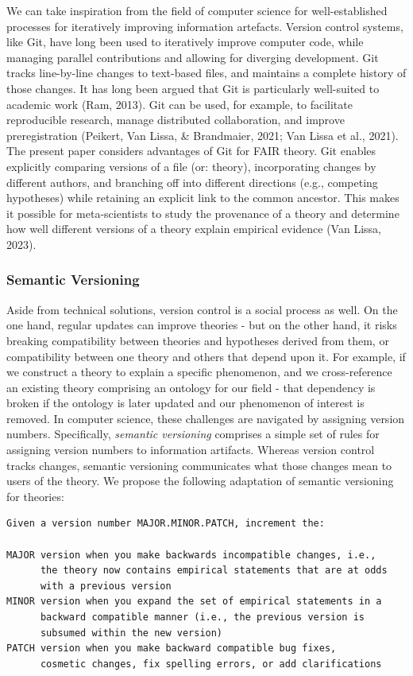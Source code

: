 \documentclass[
  man,floatsintext]{apa6}
\begin{document}
We can take inspiration from the field of computer science for well-established processes for iteratively improving information artefacts.
Version control systems, like Git, have long been used to iteratively improve computer code, while managing parallel contributions and allowing for diverging development.
Git tracks line-by-line changes to text-based files,
and maintains a complete history of those changes.
It has long been argued that Git is particularly well-suited to academic work (Ram, 2013).
Git can be used, for example, to facilitate reproducible research, manage distributed collaboration, and improve preregistration (Peikert, Van Lissa, \& Brandmaier, 2021; Van Lissa et al., 2021).
The present paper considers advantages of Git for FAIR theory.
Git enables explicitly comparing versions of a file (or: theory),
incorporating changes by different authors,
and branching off into different directions (e.g., competing hypotheses) while retaining an explicit link to the common ancestor.
This makes it possible for meta-scientists to study the provenance of a theory and determine how well different versions of a theory explain empirical evidence (Van Lissa, 2023).

\subsubsection{Semantic Versioning}\label{semantic-versioning}

Aside from technical solutions, version control is a social process as well.
On the one hand, regular updates can improve theories - but on the other hand, it risks breaking compatibility between theories and hypotheses derived from them, or compatibility between one theory and others that depend upon it.
For example, if we construct a theory to explain a specific phenomenon, and we cross-reference an existing theory comprising an ontology for our field - that dependency is broken if the ontology is later updated and our phenomenon of interest is removed.
In computer science, these challenges are navigated by assigning version numbers.
Specifically, \emph{semantic versioning} comprises a simple set of rules for assigning version numbers to information artifacts.
Whereas version control tracks changes,
semantic versioning communicates what those changes mean to users of the theory.
We propose the following adaptation of semantic versioning for theories:

\begin{verbatim}
Given a version number MAJOR.MINOR.PATCH, increment the:

MAJOR version when you make backwards incompatible changes, i.e.,
      the theory now contains empirical statements that are at odds
      with a previous version
MINOR version when you expand the set of empirical statements in a
      backward compatible manner (i.e., the previous version is
      subsumed within the new version)
PATCH version when you make backward compatible bug fixes,
      cosmetic changes, fix spelling errors, or add clarifications
\end{verbatim}
\end{document}
